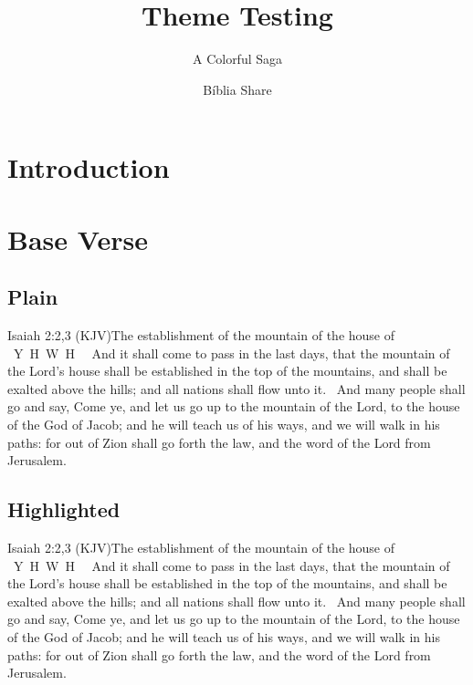 \documentclass[12pt,aspectratio=169]{beamer}
\title{Theme Testing}
\subtitle{A Colorful Saga}
\author{Bíblia Share}
\date{\space}%
\newcommand{\YA}{%
    \mbox{%
        Y\makebox[0pt][l]{\hspace{-0.178em}\raisebox{-0.00ex}{\scalebox{0.30}{E}}}%
        H\makebox[0pt][l]{\hspace{-0.010em}\raisebox{-0.00ex}{\scalebox{0.30}{O}}}%
        W\makebox[0pt][l]{\hspace{-0.245em}\raisebox{-0.00ex}{\scalebox{0.30}{A}}}%
        H%
    }%
}
\newcommand{\ver}[1]{%
    \raisebox{0.75ex}{%
        \scalebox{1.1}{%
            \pmb{\textbf{\textcolor{BSpbg}{#1}}}%
        }%
    }%
}
\newcommand{\RED}[1]{{\textcolor{TXred}{#1}}}
\newcommand{\YEL}[1]{{\textcolor{TXyel}{#1}}}
\newcommand{\GRE}[1]{{\textcolor{TXgre}{#1}}}
\newcommand{\CYA}[1]{{\textcolor{TXcya}{#1}}}
\newcommand{\BLU}[1]{{\textcolor{TXblu}{#1}}}
\newcommand{\MAG}[1]{{\textcolor{TXmag}{#1}}}
\begin{document}
    \begin{frame}
        \titlepage
    \end{frame}
    \section{Introduction}
    \section{Base Verse}
    \subsection{Plain}

    \begin{frame}{Isaiah 2:2,3 (KJV)}{The establishment of the mountain of the house of \YA}
        \linespread{1.25}
        \ver{2}~And it shall come to pass in the last days, that  the  mountain  of  the  Lord's
        house shall be established in the top of the mountains, and shall be exalted  above  the
        hills; and all nations shall flow unto it.
        \ver{3}~And many people shall go and say, Come ye, and let us go up to the  mountain  of
        the Lord, to the house of the God of Jacob; and he will teach us of  his  ways,  and  we
        will walk in his paths: for out of Zion shall go forth the law, and the word of the Lord
        from Jerusalem.
    \end{frame}

    \subsection{Highlighted}

    \begin{frame}{Isaiah 2:2,3 (KJV)}{The establishment of the mountain of the house of \YA}
        \linespread{1.25}
        \ver{2}~And \RED{it shall come to pass} in the last  days,  that  the  mountain  of  the
        Lord's house shall be \YEL{established} in the \CYA{top of the mountains}, and shall  be
        \CYA{exalted} above the hills; and \GRE{all nations} shall flow unto it.
        \ver{3}~And \GRE{many people} shall go and say, Come ye, and let us \CYA{go up}  to  the
        mountain of the Lord, to the house of the \BLU{God of Jacob}; and he will \MAG{teach} us
        of his ways, and we will \MAG{walk} in his paths: for \YEL{out of Zion} shall  go  forth
        the \YEL{law,} and the word of the Lord \YEL{from Jerusalem}.
    \end{frame}

\end{document}

